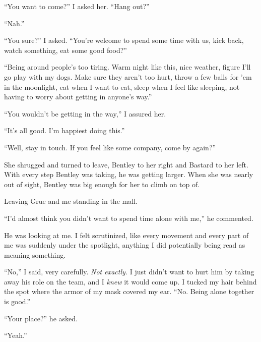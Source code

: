 ``You want to come?'' I asked her.  ``Hang out?''



``Nah.''



``You sure?'' I asked.  ``You're welcome to spend some time with us, kick back, watch something, eat some good food?''



``Being around people's too tiring.  Warm night like this, nice weather, figure I'll go play with my dogs.  Make sure they aren't too hurt, throw a few balls for 'em in the moonlight, eat when I want to eat, sleep when I feel like sleeping, not having to worry about getting in anyone's way.''



``You wouldn't be getting in the way,'' I assured her.



``It's all good.  I'm happiest doing this.''



``Well, stay in touch.  If you feel like some company, come by again?''



She shrugged and turned to leave, Bentley to her right and Bastard to her left.  With every step Bentley was taking, he was getting larger.  When she was nearly out of sight, Bentley was big enough for her to climb on top of.



Leaving Grue and me standing in the mall.



``I'd almost think you didn't want to spend time alone with me,'' he commented.



He was looking at me.  I felt scrutinized, like every movement and every part of me was suddenly under the spotlight, anything I did potentially being read as meaning something.



``No,'' I said, very carefully.  \emph{Not exactly. } I just didn't want to hurt him by taking away his role on the team, and I \emph{knew} it would come up\emph{.  }I tucked my hair behind the spot where the armor of my mask covered my ear.  ``No.  Being alone together is good.''



``Your place?'' he asked.



``Yeah.''



